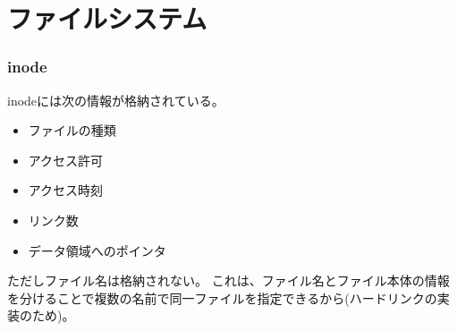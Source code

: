 \section{ファイルシステム}
\subsubsection*{inode}
inodeには次の情報が格納されている。

\begin{itemize}
    \item ファイルの種類
    \item アクセス許可
    \item アクセス時刻
    \item リンク数
    \item データ領域へのポインタ
\end{itemize}

ただしファイル名は格納されない。
これは、ファイル名とファイル本体の情報を分けることで複数の名前で同一ファイルを指定できるから(ハードリンクの実装のため)。

